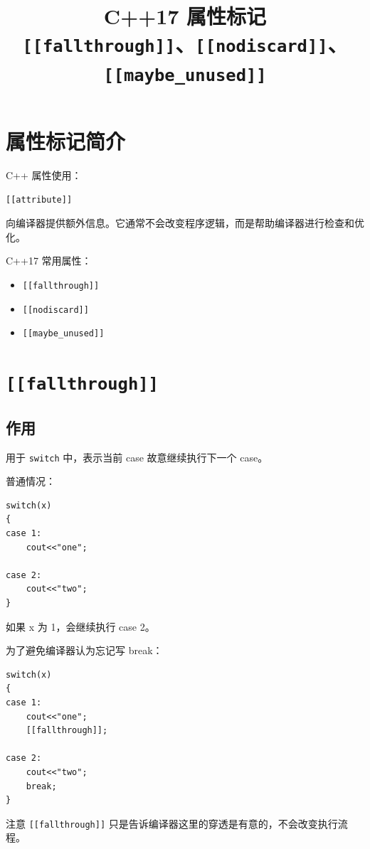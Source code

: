 \documentclass[UTF8,12pt,a4paper]{ctexart}
\title{C++17 属性标记\\
\texttt{[[fallthrough]]}、\texttt{[[nodiscard]]}、\texttt{[[maybe\_unused]]}}
\date{}
\begin{document}
\maketitle

\section{属性标记简介}

C++ 属性使用：

\begin{lstlisting}
[[attribute]]
\end{lstlisting}

向编译器提供额外信息。它通常不会改变程序逻辑，而是帮助编译器进行检查和优化。

C++17 常用属性：

\begin{itemize}
\item \texttt{[[fallthrough]]}
\item \texttt{[[nodiscard]]}
\item \texttt{[[maybe\_unused]]}
\end{itemize}

\section{\texttt{[[fallthrough]]}}

\subsection{作用}

用于 \texttt{switch} 中，表示当前 case 故意继续执行下一个 case。

普通情况：

\begin{lstlisting}
switch(x)
{
case 1:
    cout<<"one";

case 2:
    cout<<"two";
}
\end{lstlisting}

如果 x 为 1，会继续执行 case 2。

为了避免编译器认为忘记写 break：

\begin{lstlisting}
switch(x)
{
case 1:
    cout<<"one";
    [[fallthrough]];

case 2:
    cout<<"two";
    break;
}
\end{lstlisting}

\begin{boxx}{注意}
\texttt{[[fallthrough]]} 只是告诉编译器这里的穿透是有意的，不会改变执行流程。
\end{boxx}
\end{document}
